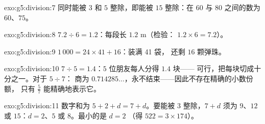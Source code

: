 \begin{solution}{exo:g5:division:7}
同时能被 $3$ 和 $5$ 整除，即能被 $15$ 整除：在 $60$ 与
$80$ 之间的数为 $60$、$75$。
\end{solution}

\begin{solution}{exo:g5:division:8}
$7.2 \div 6 = 1.2$：每段长 $1.2$ m（检验：
$1.2 \times 6 = 7.2$）。
\end{solution}

\begin{solution}{exo:g5:division:9}
$1\,000 = 24 \times 41 + 16$：装满 41 袋，
还剩 $16$ 颗弹珠。
\end{solution}

\begin{solution}{exo:g5:division:10}
$7 \div 5 = 1.4$：$5$ 位朋友每人分得 $1.4$ 块——
可行，把每块切成十分之一。对于 $5 \div 7$：
商为 $0.714285\dots$，永不结束——因此不存在精确的小数份额，
只有 $\frac57$ 能精确地表示它。
\end{solution}

\begin{solution}{exo:g5:division:11}
数字和为 $5 + 2 + d = 7 + d$。要能被 $3$ 整除，$7 + d$ 须为
$9$、$12$ 或 $15$：$d = 2$、$5$ 或 $8$。最小的是 $d = 2$
（得 $522 = 3 \times 174$）。
\end{solution}

